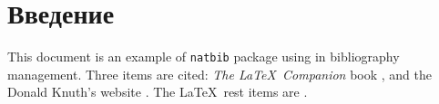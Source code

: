 \section{Введение}
This document is an example of \texttt{natbib} package using in bibliography management. Three items are cited: \textit{The \LaTeX\ Companion} book  \cite{харари1973теория}, and the Donald Knuth's website \cite{knuthwebsite}. The \LaTeX\ \acrshort{rest} items are \cite{latexcompanion,knuthwebsite}.

\clearpage